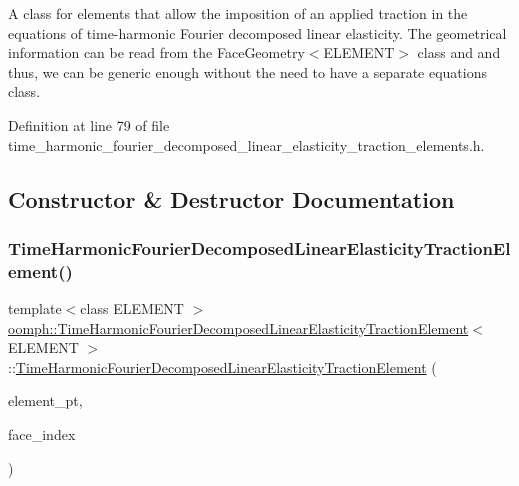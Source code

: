 A class for elements that allow the imposition of an applied traction in the equations of time-\/harmonic Fourier decomposed linear elasticity. The geometrical information can be read from the Face\+Geometry$<$\+E\+L\+E\+M\+E\+N\+T$>$ class and and thus, we can be generic enough without the need to have a separate equations class. 

Definition at line 79 of file time\+\_\+harmonic\+\_\+fourier\+\_\+decomposed\+\_\+linear\+\_\+elasticity\+\_\+traction\+\_\+elements.\+h.



\subsection{Constructor \& Destructor Documentation}
\mbox{\label{classoomph_1_1TimeHarmonicFourierDecomposedLinearElasticityTractionElement_a3359f1d578853a9f733c981148a408d8}} 
\subsubsection{\texorpdfstring{Time\+Harmonic\+Fourier\+Decomposed\+Linear\+Elasticity\+Traction\+Element()}{TimeHarmonicFourierDecomposedLinearElasticityTractionElement()}}
{\footnotesize\ttfamily template$<$class E\+L\+E\+M\+E\+NT $>$ \\
\hyperlink{classoomph_1_1TimeHarmonicFourierDecomposedLinearElasticityTractionElement}{oomph\+::\+Time\+Harmonic\+Fourier\+Decomposed\+Linear\+Elasticity\+Traction\+Element}$<$ E\+L\+E\+M\+E\+NT $>$\+::\hyperlink{classoomph_1_1TimeHarmonicFourierDecomposedLinearElasticityTractionElement}{Time\+Harmonic\+Fourier\+Decomposed\+Linear\+Elasticity\+Traction\+Element} (\begin{DoxyParamCaption}\item[{\hyperlink{classoomph_1_1FiniteElement}{Finite\+Element} $\ast$const \&}]{element\+\_\+pt,  }\item[{const int \&}]{face\+\_\+index }\end{DoxyParamCaption})\hspace{0.3cm}{\ttfamily [inline]}}



